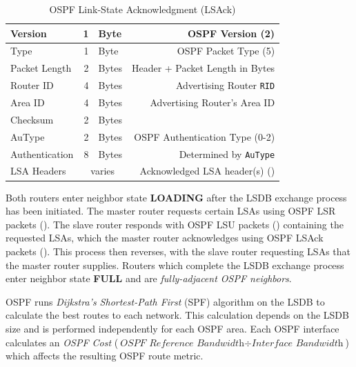 \documentclass[12pt]{article}
\newcommand{\mc}[3]{\multicolumn{#1}{#2}{#3}}
\begin{document}
	\begin{table}[H]
	\centering
	\caption{OSPF Link-State Acknowledgment (LSAck) \label{tab:OSPF LSACK}}
	\begin{tabular}{| l | r @{ } l | r |}\hline
	Version		& 1	& Byte		& OSPF Version (2)\\\hline
	Type			& 1	& Byte		& OSPF Packet Type (5)\\\hline
	Packet Length	& 2	& Bytes		& Header + Packet Length in Bytes\\\hline
	Router ID		& 4	& Bytes		& Advertising Router \texttt{RID}\\\hline
	Area ID		& 4	& Bytes		& Advertising Router's Area ID\\\hline
	Checksum		& 2	& Bytes		&\\\hline
	AuType		& 2	& Bytes		& OSPF Authentication Type (0-2)\\\hline
	Authentication	& 8	& Bytes		& Determined by \texttt{AuType}\\\hline
	LSA Headers	& \mc{2}{c|}{varies}	& Acknowledged LSA header(s) (\Cref{tab:OSPF LSA})\\\hline
	\end{tabular}\end{table}
	Both routers enter neighbor state \textbf{LOADING} after the LSDB exchange process has been initiated. The master router requests certain LSAs using OSPF LSR packets (). The slave router responds with OSPF LSU packets () containing the requested LSAs, which the master router acknowledges using OSPF LSAck packets (). This process then reverses, with the slave router requesting LSAs that the master router supplies. Routers which complete the LSDB exchange process enter neighbor state \textbf{FULL} and are \textit{fully-adjacent OSPF neighbors}.

	OSPF runs \textit{Dijkstra's Shortest-Path First} (SPF) algorithm on the LSDB to calculate the best routes to each network. This calculation depends on the LSDB size and is performed independently for each OSPF area. Each OSPF interface calculates an \textit{OSPF Cost} ($\textit{OSPF Reference Bandwidth} \div \textit{Interface Bandwidth}$) which affects the resulting OSPF route metric.





\end{document}
